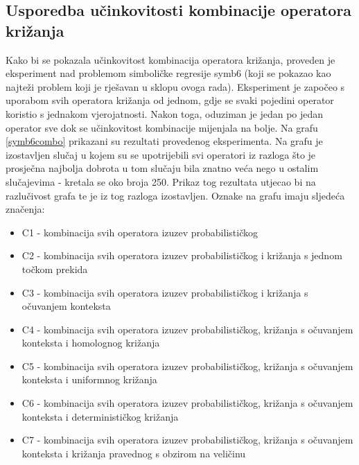 \subsection{Usporedba učinkovitosti kombinacije operatora križanja}

Kako bi se pokazala učinkovitost kombinacija operatora križanja, proveden je eksperiment nad problemom simboličke regresije symb6 (koji se pokazao kao najteži problem koji je rješavan u sklopu ovoga rada). Eksperiment je započeo s uporabom svih operatora križanja od jednom, gdje se svaki pojedini operator koristio s jednakom vjerojatnosti. Nakon toga, oduziman je jedan po jedan operator sve dok se učinkovitost kombinacije mijenjala na bolje. Na grafu \ref{symb6combo} prikazani su rezultati provedenog eksperimenta. Na grafu je izostavljen slučaj u kojem su se upotrijebili svi operatori iz razloga što je prosječna najbolja dobrota u tom slučaju bila znatno veća nego u ostalim slučajevima - kretala se oko broja 250. Prikaz tog rezultata utjecao bi na razlučivost grafa te je iz tog razloga izostavljen. Oznake na grafu imaju sljedeća značenja:

\begin{itemize}
\item{C1 - kombinacija svih operatora izuzev probabilističkog}
\item{C2 - kombinacija svih operatora izuzev probabilističkog i križanja s jednom točkom prekida}
\item{C3 - kombinacija svih operatora izuzev probabilističkog i križanja s očuvanjem konteksta}
\item{C4 - kombinacija svih operatora izuzev probabilističkog, križanja s očuvanjem konteksta i homolognog križanja}
\item{C5 - kombinacija svih operatora izuzev probabilističkog, križanja s očuvanjem konteksta i uniformnog križanja}
\item{C6 - kombinacija svih operatora izuzev probabilističkog, križanja s očuvanjem konteksta i determinističkog križanja}
\item{C7 - kombinacija svih operatora izuzev probabilističkog, križanja s očuvanjem konteksta i križanja pravednog s obzirom na veličinu}

\end{itemize}

